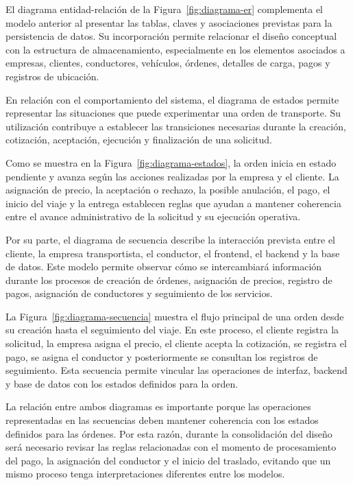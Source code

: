 El diagrama entidad-relación de la Figura~\ref{fig:diagrama-er} complementa el modelo anterior al presentar las tablas, claves y asociaciones previstas para la persistencia de datos. Su incorporación permite relacionar el diseño conceptual con la estructura de almacenamiento, especialmente en los elementos asociados a empresas, clientes, conductores, vehículos, órdenes, detalles de carga, pagos y registros de ubicación.

En relación con el comportamiento del sistema, el diagrama de estados permite representar las situaciones que puede experimentar una orden de transporte. Su utilización contribuye a establecer las transiciones necesarias durante la creación, cotización, aceptación, ejecución y finalización de una solicitud.

Como se muestra en la Figura~\ref{fig:diagrama-estados}, la orden inicia en estado pendiente y avanza según las acciones realizadas por la empresa y el cliente. La asignación de precio, la aceptación o rechazo, la posible anulación, el pago, el inicio del viaje y la entrega establecen reglas que ayudan a mantener coherencia entre el avance administrativo de la solicitud y su ejecución operativa.

Por su parte, el diagrama de secuencia describe la interacción prevista entre el cliente, la empresa transportista, el conductor, el frontend, el backend y la base de datos. Este modelo permite observar cómo se intercambiará información durante los procesos de creación de órdenes, asignación de precios, registro de pagos, asignación de conductores y seguimiento de los servicios.

La Figura~\ref{fig:diagrama-secuencia} muestra el flujo principal de una orden desde su creación hasta el seguimiento del viaje. En este proceso, el cliente registra la solicitud, la empresa asigna el precio, el cliente acepta la cotización, se registra el pago, se asigna el conductor y posteriormente se consultan los registros de seguimiento. Esta secuencia permite vincular las operaciones de interfaz, backend y base de datos con los estados definidos para la orden.

La relación entre ambos diagramas es importante porque las operaciones representadas en las secuencias deben mantener coherencia con los estados definidos para las órdenes. Por esta razón, durante la consolidación del diseño será necesario revisar las reglas relacionadas con el momento de procesamiento del pago, la asignación del conductor y el inicio del traslado, evitando que un mismo proceso tenga interpretaciones diferentes entre los modelos.

